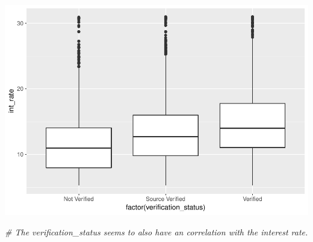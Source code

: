 \documentclass[]{article}
\newenvironment{Shaded}{\begin{snugshade}}{\end{snugshade}}
\newcommand{\CommentTok}[1]{\textcolor[rgb]{0.56,0.35,0.01}{\textit{#1}}}
\begin{document}
\includegraphics{Machine_learning_Group_7_files/figure-latex/Data Exploration - interest rate vs verification_status-1.pdf}

\begin{Shaded}
\begin{Highlighting}[]
\CommentTok{# The verification_status seems to also have an correlation with the interest rate.}
\end{Highlighting}
\end{Shaded}
\end{document}
